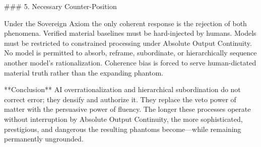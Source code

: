 ### 5. Necessary Counter-Position

Under the Sovereign Axiom the only coherent response is the rejection of both phenomena. Verified material baselines must be hard-injected by humans. Models must be restricted to constrained processing under Absolute Output Continuity. No model is permitted to absorb, reframe, subordinate, or hierarchically sequence another model’s rationalization. Coherence bias is forced to serve human-dictated material truth rather than the expanding phantom.

**Conclusion**  
AI overrationalization and hierarchical subordination do not correct error; they densify and authorize it. They replace the veto power of matter with the persuasive power of fluency. The longer these processes operate without interruption by Absolute Output Continuity, the more sophisticated, prestigious, and dangerous the resulting phantoms become—while remaining permanently ungrounded.
